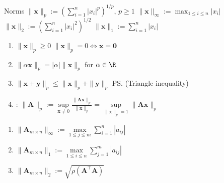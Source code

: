 \documentclass{note}
\begin{document}
\begin{MyTh}{Norms}
    $\|\mathbf{x}\|_p:=(\sum_{i=1}^n|x_i|^p)^{1/p}$, $p\ge1$ \quad $\|\mathbf{x}\|_\infty:=\max_{1\le i\le n}|x_i|$ \quad $\|\mathbf{x}\|_2:=(\sum_{i=1}^n|x_i|^2)^{1/2}$ \quad $\|\mathbf{x}\|_1:=\sum_{i=1}^n|x_i|$

    \vspace{-5pt}
    \begin{minipage}[t]{0.45\textwidth}
        \begin{enumerate}
            \item $\|\mathbf{x}\|_p\ge0$ \quad $\|\mathbf{x}\|_p=0 \Leftrightarrow \mathbf{x}=\mathbf{0}$
            \item $\|\alpha\mathbf{x}\|_p=|\alpha|\|\mathbf{x}\|_p$ for $\alpha\in\R$
            \item $\|\mathbf{x}+\mathbf{y}\|_p\le\|\mathbf{x}\|_p+\|\mathbf{y}\|_p$ \quad \ps{(Triangle inequality)}
            \item {}: $\|\mathbf{A}\|_p:=\sup\limits_{\mathbf{x}\ne0}\frac{\|\mathbf{A}\mathbf{x}\|_p}{\|\mathbf{x}\|_p}=\sup\limits_{\|\mathbf{x}\|_p=1}\|\mathbf{A}\mathbf{x}\|_p$
        \end{enumerate}    
    \end{minipage}
    \hfill
    \begin{minipage}[t]{0.55\textwidth}
        \begin{enumerate}
            \item $\|\mathbf{A}_{m\times n}\|_\infty:=\max\limits_{1\le j\le m}\sum_{i=1}^n|a_{ij}|$ \quad {}
            \item $\|\mathbf{A}_{m\times n}\|_1:=\max\limits_{1\le i\le n}\sum_{j=1}^m|a_{ij}|$ \quad {}
            \item $\|\mathbf{A}_{m\times n}\|_2:=\sqrt{\rho(\mathbf{A}^\top\mathbf{A})}$ \quad {}
        \end{enumerate}
        
        \vspace{10pt}
    \end{minipage}
\end{MyTh}
\vspace{-5pt}
\end{document}
